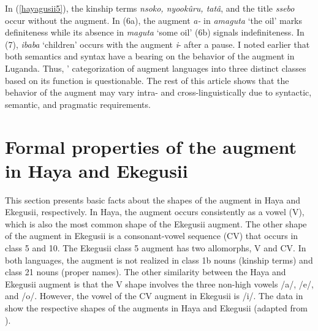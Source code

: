 \documentclass[output=paper]{langscibook}
\begin{document}
In (\ref{hayagusii5}), the kinship terms \textit{nsoko, nyookûru, tatâ}, and the title \textit{ssebo} occur without the augment. In (6a), the augment \textit{a-} in \textit{amaguta} ‘the oil’ marks definiteness while its absence in \textit{maguta} ‘some oil’ (6b) signals indefiniteness. In (7), \textit{ibaba} ‘children’ occurs with the augment \textit{i}- after a pause. I noted earlier that both semantics and syntax have a bearing on the behavior of the augment in Luganda. Thus, \citeauthor{blois1970augment}’ categorization of augment languages into three distinct classes based on its function is questionable. The rest of this article shows that the behavior of the augment may vary intra- and cross-linguistically due to syntactic, semantic, and pragmatic requirements.

\section{Formal properties of the augment in Haya and Ekegusii} \label{sec:choti:3}
  This section presents basic facts about the shapes of the augment in Haya and Ekegusii, respectively. In Haya, the augment occurs consistently as a vowel (V), which is also the most common shape of the Ekegusii augment. The other shape of the augment in Ekegusii is a consonant-vowel sequence (CV) that occurs in class 5 and 10.  The Ekegusii class 5 augment has two allomorphs, V and CV. In both languages, the augment is not realized in class 1b nouns (kinship terms) and class 21 nouns (proper names). The other similarity between the Haya and Ekegusii augment is that the V shape involves the three non-high vowels /a/, /e/, and /o/. However, the vowel of the CV augment in Ekegusii is /i/.  The data in  show the respective shapes of the augments in Haya \citep[35]{chagas1977} and Ekegusii (adapted from \citealt[199]{cammenga2002phonology}). 
\end{document}
